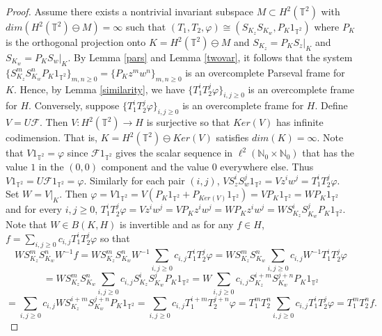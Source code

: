 \documentclass[12pt,reqno]{amsart}
\theoremstyle{definition}
\theoremstyle{definition}
\numberwithin{equation}{section}
\begin{document}
\begin{proof}
Assume there exists a nontrivial invariant subspace $M \subset H^2(\mathbb{T}^2)$ with 
\newline
$dim(H^2(\mathbb{T}^2) \ominus M) = \infty$ such that $(T_1, T_2, \varphi)\cong (S_{K_z} S_{K_w}, P_{K}{1}_{\mathbb{T}^2})$ where $P_{K}$ is the orthogonal projection onto $K = H^2(\mathbb{T}^2) \ominus M$ and $S_{K_z} = P_{K} \left.S_{z}\right|_{K} $ and  $S_{K_w} = P_{K} \left.S_{w}\right|_{K}$. By Lemma \ref{pars} and Lemma \ref{twovar}, it follows that the system $\{S_{K_z}^m S_{K_w}^n P_{K} {1}_{\mathbb{T}^2}\}_{m, n \geq 0} = \{P_{K} z^mw^n\}_{m, n \geq 0}$  is an overcomplete Parseval frame for $K$. Hence, by %
Lemma \ref{similarity}, we have  $\{T_1^iT_2^j\varphi\}_{i,j \geq 0}$ is an overcomplete frame for $H$. Conversely, suppose $\{T_1^iT_2^j\varphi\}_{i,j \geq 0}$ is an overcomplete frame for $H$. Define $V = U \mathcal{F}$. Then $V: H^2(\mathbb{T}^2) \to H$ is surjective so that $Ker(V)$ has infinite codimension. That is, $K = H^2(\mathbb{T}^2) \ominus Ker(V)$ satisfies $dim(K) =\infty$. Note that $V {1}_{\mathbb{T}^2} = \varphi$ since $\mathcal{F} {1}_{\mathbb{T}^2} $ gives the scalar sequence in $\ell^2(\mathbb{N}_0 \times \mathbb{N}_0) $ that has the value $1$ in the $(0, 0)$ component and the value $0$ everywhere else. Thus $ V {1}_{\mathbb{T}^2} = U \mathcal{F} {1}_{\mathbb{T}^2} = \varphi$. Similarly for each pair $(i, j)$, $VS_{z}^iS_{w}^j {1}_{\mathbb{T}^2} = Vz^iw^j = T_{1}^iT_{2}^j \varphi$. Set $W = \left.V\right|_{K}$. Then $\varphi = V {1}_{\mathbb{T}^2} = V(P_{K} {1}_{\mathbb{T}^2} + P_{Ker(V)} {1}_{\mathbb{T}^2}) = V P_{K} {1}_{\mathbb{T}^2} = W P_{K} {1}_{\mathbb{T}^2}$ and for every $i, j \geq 0$, $T_{1}^iT_{2}^j \varphi = Vz^iw^j = V P_{K} z^iw^j = W P_{K} z^iw^j= W S_{K_z}^i S_{K_w}^j P_{K} {1}_{\mathbb{T}^2}$. 
\newline
Note that $W \in B(K, H)$ is invertible and as for any $f \in H$, $f = \underset{i,j \geq 0}{\sum} c_{i,j} T_1^iT_2^j\varphi$ so that 
\begin{displaymath}
W S_{K_z}^m S_{K_w}^n W^{-1}f = W S_{K_z}^m S_{K_w}^n W^{-1} \underset{i,j \geq 0}{\sum} c_{i,j} T_1^iT_2^j\varphi = W S_{K_z}^m S_{K_w}^n  \underset{i,j \geq 0}{\sum} c_{i,j} W^{-1}T_1^iT_2^j\varphi 
\end{displaymath}
\begin{displaymath}
=W S_{K_z}^m S_{K_w}^n  \underset{i,j \geq 0}{\sum} c_{i,j} S_{K_z}^i S_{K_w}^j P_{K} {1}_{\mathbb{T}^2} = W \underset{i,j \geq 0}{\sum} c_{i,j} S_{K_z}^{i+m} S_{K_w}^{j+n} P_{K} {1}_{\mathbb{T}^2}  
\end{displaymath}
\begin{displaymath}
=\underset{i,j \geq 0}{\sum} c_{i,j} W S_{K_z}^{i+m} S_{K_w}^{j+n} P_{K} {1}_{\mathbb{T}^2} = \underset{i,j \geq 0}{\sum} c_{i,j} T_1^{i+m}T_2^{j+n}\varphi = T_1^{m}T_2^{n} \underset{i,j \geq 0}{\sum} c_{i,j} T_1^iT_2^j\varphi = T_1^{m}T_2^{n} f.
\end{displaymath}
\end{proof}
\end{document}
